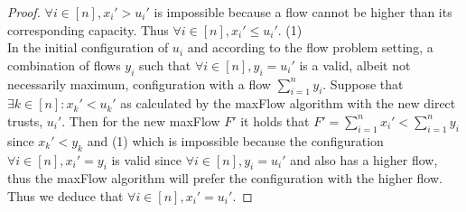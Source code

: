 \begin{proof}
   $\forall i \in [n], x_i' > u_i'$ is impossible because a flow cannot be higher than its 
   corresponding capacity. Thus $\forall i \in [n], x_i' \leq u_i'$. (1) \\ 
   In the initial configuration of $u_i$ and according to the flow problem setting, a combination of flows 
   $y_i$ such that $\forall i \in [n], y_i = u_i'$ is a valid, albeit not necessarily maximum, 
   configuration with a flow $\sum\limits_{i=1}^{n}y_i$. Suppose that $\exists k \in [n] : x_k' 
   < u_k'$ as calculated by the maxFlow algorithm with the new direct trusts, $u_i'$. Then for the new 
   maxFlow $F'$ it holds that $F' = \sum\limits_{i=1}^{n}x_i' < \sum\limits_{i=1}^{n}y_i$ since $x_k' < y_k$ 
   and (1) which is impossible because the configuration $\forall i \in [n], x_i' = y_i$ is valid since  
   $\forall i \in [n], y_i = u_i'$ and also has a higher flow, thus the maxFlow algorithm will 
   prefer the configuration with the higher flow. Thus we deduce that $\forall i \in [n], x_i' = u_i'$.
\end{proof}

